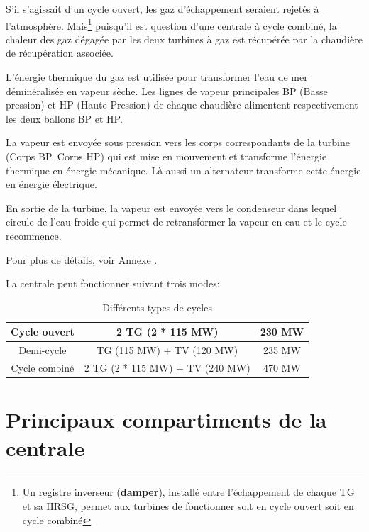 S'il s'agissait d'un cycle ouvert, les gaz d'échappement seraient rejetés à l'atmosphère.
Mais\footnote{Un registre inverseur (\textbf{damper}), installé entre l'échappement de chaque TG et sa HRSG, permet aux turbines de fonctionner soit en cycle ouvert soit en cycle combiné} puisqu'il est question d'une centrale à cycle combiné, la chaleur des gaz dégagée par les deux turbines à gaz est récupérée par la chaudière de récupération associée.

L'énergie thermique du gaz est utilisée pour transformer l'eau de mer déminéralisée en vapeur sèche.
Les lignes de vapeur principales BP (Basse pression) et HP (Haute Pression) de chaque chaudière alimentent respectivement les deux ballons BP et HP.

La vapeur est envoyée sous pression vers les corps correspondants de la turbine (Corps BP, Corps HP) qui est mise en mouvement et transforme l'énergie thermique en énergie mécanique. Là aussi un alternateur transforme cette énergie en énergie électrique.

En sortie de la turbine, la vapeur est envoyée vers le condenseur dans lequel circule de l'eau froide qui permet de retransformer la vapeur en eau et le cycle recommence.

Pour plus de détails, voir Annexe \uppercase\expandafter{}.

La centrale peut fonctionner suivant trois modes: 
\begin{table}[h]

\centering
\begin{tabular}{|c|c|c|}
\hline
Cycle ouvert  & 2 TG (2 * 115 MW) &  230 MW\\
\hline
Demi-cycle  & TG (115 MW)  + TV (120 MW)  & 235 MW \\
\hline
Cycle combiné  & 2 TG (2 * 115 MW) + TV (240 MW)   & 470 MW \\
\hline
\end{tabular}
\caption{Différents types de cycles}
\end{table}



\section{Principaux compartiments de la centrale }
